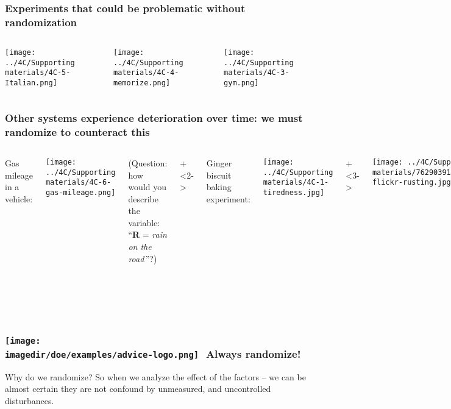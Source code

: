 \begin{frame}\frametitle{Experiments that could be problematic without randomization}
	\begin{columns}[T]
			\texttt{[image: ../4C/Supporting materials/4C-5-Italian.png]}
		
			\texttt{[image: ../4C/Supporting materials/4C-4-memorize.png]}
		
			\texttt{[image: ../4C/Supporting materials/4C-3-gym.png]}
			
	\end{columns}
\end{frame}

\begin{frame}\frametitle{Other systems experience deterioration over time: we must randomize to counteract this}
	\begin{columns}[T]
			Gas mileage in a vehicle: 
			
			\texttt{[image: ../4C/Supporting materials/4C-6-gas-mileage.png]}
			
			\vspace{2.5cm}
			{\scriptsize (Question: how would you describe the variable: ``\textbf{R} = \emph{rain on the road}\,''?)}
		
			
			\onslide+<2->{
				Ginger biscuit baking experiment: 
			
				\texttt{[image: ../4C/Supporting materials/4C-1-tiredness.jpg]}
			}
		
		
			\onslide+<3->{
				\texttt{[image: ../4C/Supporting materials/7629039140\_c2e2cde0c8\_o-flickr-rusting.jpg]}
				
				\vspace{-0.52cm}
				{\tiny \href{https://secure.flickr.com/photos/mikecogh/7629039140}{Flickr: mikecogh}}
				
				
				{\scriptsize 
					This is a slow moving disturbance: we must account for it though if we run experiments that span several months, or years.
				}
			}
			
	\end{columns}
\end{frame}

\begin{frame}\frametitle{\texttt{[image: \\imagedir/doe/examples/advice-logo.png]}\,\, Always randomize!}
	
	\begin{exampleblock}{Why do we randomize?}
		So when we analyze the effect of the factors -- we can be almost certain they are not confound by unmeasured, and uncontrolled disturbances.
	\end{exampleblock}
	
\end{frame}

